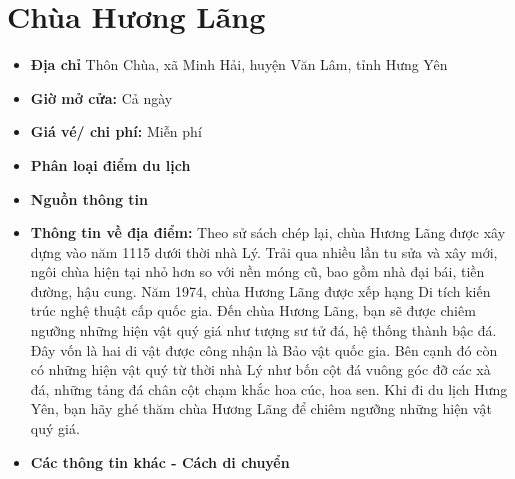 \documentclass{article}
\begin{document}
\section{Chùa Hương Lãng}
\begin{itemize}
    \item{\textbf{Địa chỉ}} Thôn Chùa, xã Minh Hải, huyện Văn Lâm, tỉnh Hưng Yên

    \item{\textbf{Giờ mở cửa:}} Cả ngày

    \item{\textbf{Giá vé/ chi phí:}} Miễn phí

    \item{\textbf{Phân loại điểm du lịch}} 

    \item{\textbf{Nguồn thông tin}} 

    \item{\textbf{Thông tin về địa điểm:}} Theo sử sách chép lại, chùa Hương Lãng được xây dựng vào năm 1115 dưới thời nhà Lý. Trải qua nhiều lần tu sửa và xây mới, ngôi chùa hiện tại nhỏ hơn so với nền móng cũ, bao gồm nhà đại bái, tiền đường, hậu cung. Năm 1974, chùa Hương Lãng được xếp hạng Di tích kiến trúc nghệ thuật cấp quốc gia. Đến chùa Hương Lãng, bạn sẽ được chiêm ngưỡng những hiện vật quý giá như tượng sư tử đá, hệ thống thành bậc đá. Đây vốn là hai di vật được công nhận là Bảo vật quốc gia. Bên cạnh đó còn có những hiện vật quý từ thời nhà Lý như bốn cột đá vuông góc đỡ các xà đá, những tảng đá chân cột chạm khắc hoa cúc, hoa sen. Khi đi du lịch Hưng Yên, bạn hãy ghé thăm chùa Hương Lãng để chiêm ngưỡng những hiện vật quý giá.
\end{itemize}

\begin{itemize}
    \item{\textbf{Các thông tin khác - Cách di chuyển}} 
\end{itemize}
\end{document}
